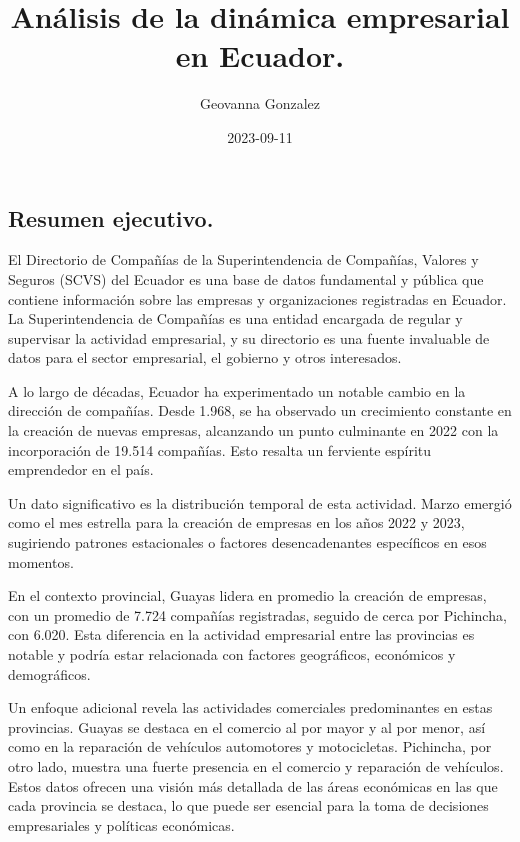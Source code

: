 \documentclass[
]{article}
\title{Análisis de la dinámica empresarial en Ecuador.}
\author{Geovanna Gonzalez}
\date{2023-09-11}
\begin{document}
\maketitle

\hypertarget{resumen-ejecutivo.}{%
\subsection{\texorpdfstring{\textbf{Resumen
ejecutivo.}}{Resumen ejecutivo.}}\label{resumen-ejecutivo.}}

El Directorio de Compañías de la Superintendencia de Compañías, Valores
y Seguros (SCVS) del Ecuador es una base de datos fundamental y pública
que contiene información sobre las empresas y organizaciones registradas
en Ecuador. La Superintendencia de Compañías es una entidad encargada de
regular y supervisar la actividad empresarial, y su directorio es una
fuente invaluable de datos para el sector empresarial, el gobierno y
otros interesados.

A lo largo de décadas, Ecuador ha experimentado un notable cambio en la
dirección de compañías. Desde 1.968, se ha observado un crecimiento
constante en la creación de nuevas empresas, alcanzando un punto
culminante en 2022 con la incorporación de 19.514 compañías. Esto
resalta un ferviente espíritu emprendedor en el país.

Un dato significativo es la distribución temporal de esta actividad.
Marzo emergió como el mes estrella para la creación de empresas en los
años 2022 y 2023, sugiriendo patrones estacionales o factores
desencadenantes específicos en esos momentos.

En el contexto provincial, Guayas lidera en promedio la creación de
empresas, con un promedio de 7.724 compañías registradas, seguido de
cerca por Pichincha, con 6.020. Esta diferencia en la actividad
empresarial entre las provincias es notable y podría estar relacionada
con factores geográficos, económicos y demográficos.

Un enfoque adicional revela las actividades comerciales predominantes en
estas provincias. Guayas se destaca en el comercio al por mayor y al por
menor, así como en la reparación de vehículos automotores y
motocicletas. Pichincha, por otro lado, muestra una fuerte presencia en
el comercio y reparación de vehículos. Estos datos ofrecen una visión
más detallada de las áreas económicas en las que cada provincia se
destaca, lo que puede ser esencial para la toma de decisiones
empresariales y políticas económicas.
\end{document}
